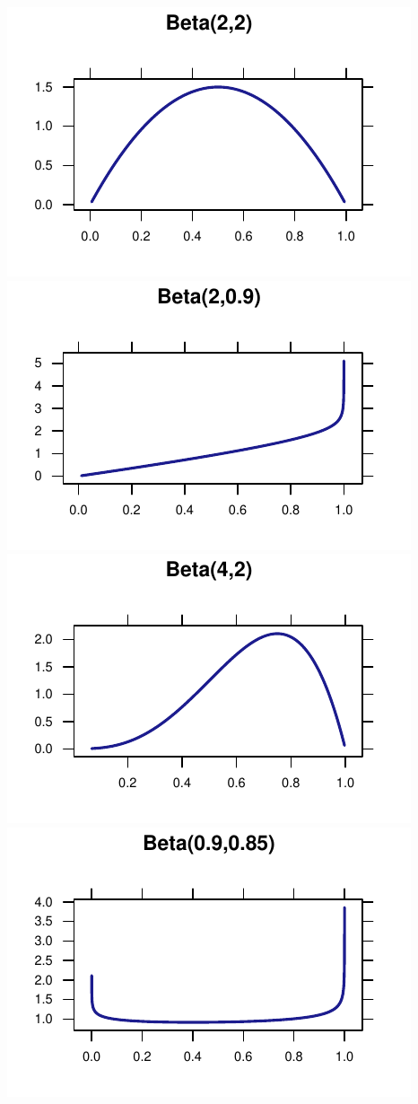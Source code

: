 \documentclass[twoside]{book}\usepackage[]{graphicx}\usepackage[]{xcolor}
\makeatletter
\def\maxwidth{ %
  \ifdim\Gin@nat@width>\linewidth
    \linewidth
  \else
    \Gin@nat@width
  \fi
}
\newenvironment{knitrout}{}{} %
\makeatother
\begin{document}
\begin{knitrout}
{\centering \includegraphics[width=\maxwidth]{figures/fig-unnamed-chunk-87-1} 
\includegraphics[width=\maxwidth]{figures/fig-unnamed-chunk-87-2} 
\includegraphics[width=\maxwidth]{figures/fig-unnamed-chunk-87-3} 
\includegraphics[width=\maxwidth]{figures/fig-unnamed-chunk-87-4} 

}
\end{knitrout}
\end{document}
